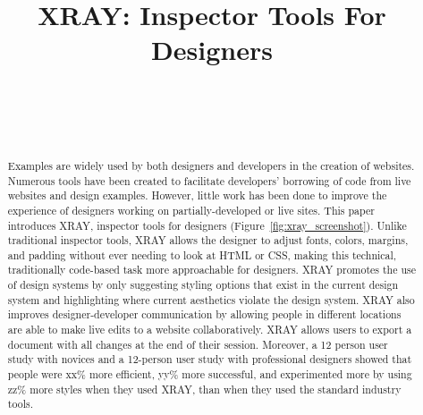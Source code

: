 \documentclass{sigchi}
\newcommand{\xray}{XRAY\xspace}
\def\plaintitle{XRAY: Inspector Tools For Designers}
\begin{document}
\title{\plaintitle}

\author{%
  \\
  \\
  \\
}

\maketitle

\begin{abstract}
Examples are widely used by both designers and developers in the creation of websites. Numerous tools have been created to facilitate developers' borrowing of code from live websites and design examples. However, little work has been done to improve the experience of designers working on partially-developed or live sites. This paper introduces \xray, inspector tools for designers (Figure~\ref{fig:xray_screenshot}). Unlike traditional inspector tools, \xray allows the designer to adjust fonts, colors, margins, and padding without ever needing to look at HTML or CSS, making this technical, traditionally code-based task more approachable for designers. \xray promotes the use of design systems by only suggesting styling options that exist in the current design system and highlighting where current aesthetics violate the design system. \xray also improves designer-developer communication by allowing people in different locations are able to make live edits to a website collaboratively. \xray allows users to export a document with all changes at the end of their session. 
Moreover, a 12 person user study with novices and a 12-person user study with professional designers showed that people were xx\% more efficient, yy\% more successful, and experimented more by using zz\% more styles when they used \xray, than when they used the standard industry tools. 
\end{abstract}
\end{document}
